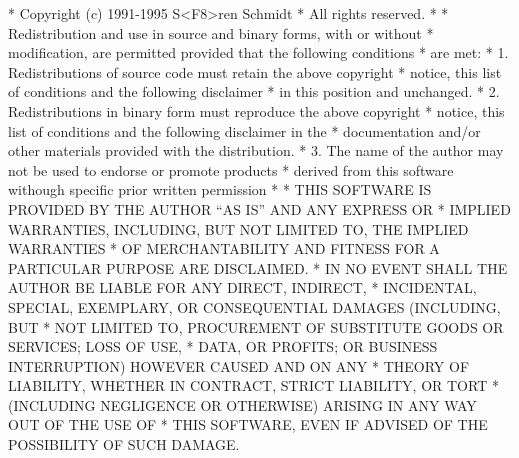 \begin{copyrightEnv}
 * Copyright (c) 1991-1995 S<F8>ren Schmidt
 * All rights reserved.
 *
 * Redistribution and use in source and binary forms, with or without
 * modification, are permitted provided that the following conditions
 * are met:
 * 1. Redistributions of source code must retain the above copyright
 *    notice, this list of conditions and the following disclaimer
 *    in this position and unchanged.
 * 2. Redistributions in binary form must reproduce the above copyright
 *    notice, this list of conditions and the following disclaimer in the
 *    documentation and/or other materials provided with the distribution.
 * 3. The name of the author may not be used to endorse or promote products
 *    derived from this software withough specific prior written permission
 *
 * THIS SOFTWARE IS PROVIDED BY THE AUTHOR ``AS IS'' AND ANY EXPRESS OR
 * IMPLIED WARRANTIES, INCLUDING, BUT NOT LIMITED TO, THE IMPLIED WARRANTIES
 * OF MERCHANTABILITY AND FITNESS FOR A PARTICULAR PURPOSE ARE DISCLAIMED.
 * IN NO EVENT SHALL THE AUTHOR BE LIABLE FOR ANY DIRECT, INDIRECT,
 * INCIDENTAL, SPECIAL, EXEMPLARY, OR CONSEQUENTIAL DAMAGES (INCLUDING, BUT
 * NOT LIMITED TO, PROCUREMENT OF SUBSTITUTE GOODS OR SERVICES; LOSS OF USE,
 * DATA, OR PROFITS; OR BUSINESS INTERRUPTION) HOWEVER CAUSED AND ON ANY
 * THEORY OF LIABILITY, WHETHER IN CONTRACT, STRICT LIABILITY, OR TORT
 * (INCLUDING NEGLIGENCE OR OTHERWISE) ARISING IN ANY WAY OUT OF THE USE OF
 * THIS SOFTWARE, EVEN IF ADVISED OF THE POSSIBILITY OF SUCH DAMAGE.
\end{copyrightEnv}

